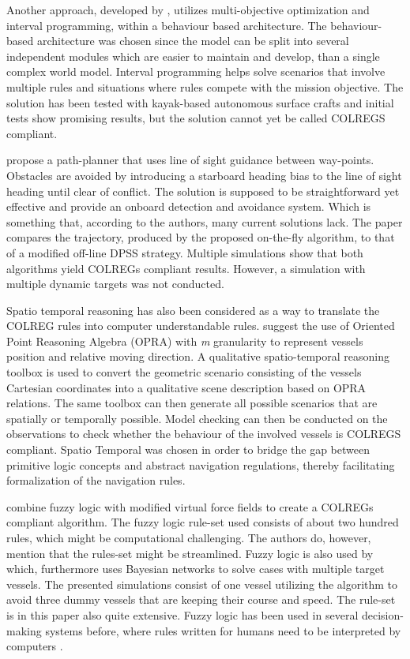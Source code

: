 Another approach, developed by \textcite{benjamin2004colregs,benjamin2006method}, utilizes multi-objective optimization and interval programming, within a behaviour based architecture. The behaviour-based architecture was chosen since the model can be split into several independent modules which are easier to maintain and develop, than a single complex world model.  Interval programming helps solve scenarios that involve  multiple rules and situations where rules compete with the mission objective. The solution has been tested with kayak-based autonomous surface crafts and initial tests show promising results, but the solution cannot yet be called COLREGS compliant.


\textcite{naeem2012colregs}
propose a path-planner that uses line of sight guidance between way-points. Obstacles are avoided by introducing a starboard heading bias to the line of sight heading until clear of conflict. The solution is supposed to be straightforward yet effective and  provide an onboard detection and avoidance system. Which is something that, according to the authors, many current solutions lack. The paper compares the trajectory, produced by the proposed on-the-fly algorithm, to that of a modified off-line DPSS strategy. Multiple simulations show that both algorithms yield COLREGs compliant results. However, a simulation with multiple dynamic targets was not conducted.

Spatio temporal reasoning has also been considered as a way to translate the COLREG rules into computer understandable rules. \textcite{spat_temp1,spat_temp2}
suggest the use of Oriented Point Reasoning Algebra (OPRA) with \textit{m}  granularity to represent vessels position and relative moving direction.
A qualitative spatio-temporal reasoning toolbox is used to convert the geometric scenario consisting of the vessels Cartesian coordinates into a qualitative scene description based on OPRA relations. The same toolbox can then generate all possible scenarios that are spatially or temporally possible. Model checking can then be conducted on the  observations to check whether the behaviour of the involved vessels is  COLREGS compliant. Spatio Temporal was chosen in order to bridge the gap between primitive logic concepts and abstract navigation regulations, thereby facilitating formalization of the navigation rules.


\textcite{lee2004fuzzy} combine fuzzy logic with modified virtual force fields to  create a COLREGs compliant algorithm. The fuzzy logic rule-set used consists of about two hundred rules, which might be computational challenging. The authors do, however, mention that the rules-set might be streamlined. Fuzzy logic is also used by \textcite{perera2012intelligent} which, furthermore uses Bayesian networks to solve cases with multiple target vessels. The presented simulations consist of one vessel utilizing the algorithm to avoid three dummy vessels that are keeping their course and speed. The rule-set is in this paper also quite extensive. Fuzzy logic has been used in several decision-making systems before, where rules written for humans need to be interpreted by computers \cite{perera2012intelligent}.


